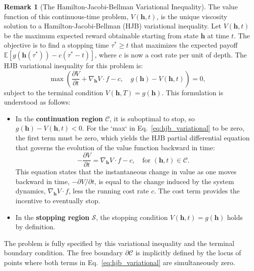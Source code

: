 \documentclass[12pt]{imsart}
\newcommand{\E}{\mathbb{E}}
\newcommand{\h}{\mathbf{h}}
\theoremstyle{plain}
\theoremstyle{definition}
\newtheorem{remark}[theorem]{Remark}
\begin{document}
\begin{remark}[The Hamilton-Jacobi-Bellman Variational Inequality]
The value function of this continuous-time problem, $V(\h, t)$, is the unique viscosity solution to a Hamilton-Jacobi-Bellman (HJB) variational inequality. Let $V(\h, t)$ be the maximum expected reward obtainable starting from state $\h$ at time $t$. The objective is to find a stopping time $\tau^* \ge t$ that maximizes the expected payoff $\E[g(\h(\tau^*)) - c(\tau^* - t)]$, where $c$ is now a cost rate per unit of depth. The HJB variational inequality for this problem is:
\begin{equation} \label{eq:hjb_variational}
\max\left( \frac{\partial V}{\partial t} + \nabla_\h V \cdot f - c, \quad g(\h) - V(\h, t) \right) = 0,
\end{equation}
subject to the terminal condition $V(\h,T) = g(\h)$. This formulation is understood as follows:
\begin{itemize}
    \item In the \textbf{continuation region} $\mathcal{C}$, it is suboptimal to stop, so $g(\h) - V(\h, t) < 0$. For the `max` in Eq.~\eqref{eq:hjb_variational} to be zero, the first term must be zero, which yields the HJB partial differential equation that governs the evolution of the value function backward in time:
    \begin{equation} \label{eq:hjb}
    -\frac{\partial V}{\partial t} = \nabla_\h V \cdot f - c, \quad \text{for } (\h,t) \in \mathcal{C}.
    \end{equation}
    This equation states that the instantaneous change in value as one moves backward in time, $-\partial V/\partial t$, is equal to the change induced by the system dynamics, $\nabla_\h V \cdot f$, less the running cost rate $c$. The cost term provides the incentive to eventually stop.
    \item In the \textbf{stopping region} $\mathcal{S}$, the stopping condition $V(\h, t) = g(\h)$ holds by definition.
\end{itemize}
The problem is fully specified by this variational inequality and the terminal boundary condition. The free boundary $\partial\mathcal{C}$ is implicitly defined by the locus of points where both terms in Eq.~\eqref{eq:hjb_variational} are simultaneously zero.
\end{remark}

\end{document}
